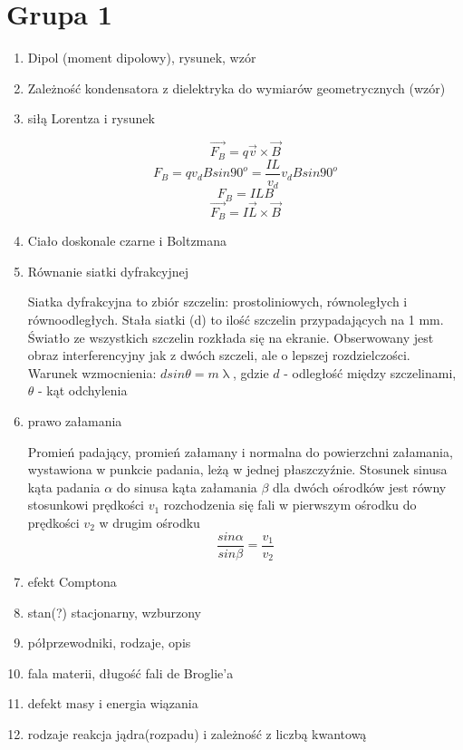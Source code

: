 \documentclass[12pt,a4paper]{article}
\begin{document}
\section{Grupa 1}
\begin {enumerate}


\item Dipol (moment dipolowy), rysunek, wzór

\item Zależność kondensatora z dielektryka do wymiarów geometrycznych (wzór)

\item siłą Lorentza i rysunek

 $$\vec{F_B}=q\vec{v}\times\vec{B}$$
 $$F_B = qv_dBsin90^o=\frac{IL}{v_d}v_dBsin90^o$$
 $$F_B=ILB$$
 $$\vec{F_B}=I\vec{L}\times\vec{B}$$

\item Ciało doskonale czarne i Boltzmana

\item Równanie siatki dyfrakcyjnej

Siatka dyfrakcyjna to zbiór szczelin: prostoliniowych, równoległych i równoodległych. Stała siatki (d) to ilość szczelin przypadających na 1 mm. Światło ze wszystkich szczelin rozkłada się na ekranie. Obserwowany jest obraz interferencyjny jak z dwóch szczeli, ale o lepszej rozdzielczości.\\
Warunek wzmocnienia: $dsin\theta =m\uplambda$, gdzie $d$ - odległość między szczelinami, $\theta$ - kąt odchylenia

\item prawo załamania

Promień padający, promień załamany i normalna do powierzchni załamania, wystawiona w punkcie padania, leżą w jednej płaszczyźnie. Stosunek sinusa kąta padania $\alpha$ do sinusa kąta załamania $\beta$ dla dwóch ośrodków jest równy stosunkowi prędkości $v_1$ rozchodzenia się fali w pierwszym ośrodku do prędkości $v_2$ w drugim ośrodku
$$\frac{sin\alpha}{sin\beta}=\frac{v_1}{v_2}$$

\item efekt Comptona

\item stan(?) stacjonarny, wzburzony

\item półprzewodniki, rodzaje, opis

\item fala materii, długość fali de Broglie'a

\item defekt masy i energia wiązania

\item rodzaje reakcja jądra(rozpadu) i zależność z liczbą kwantową

\end{enumerate}
\end{document}
